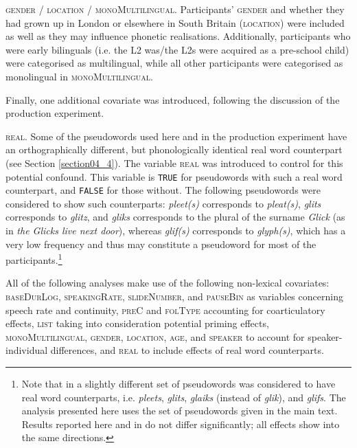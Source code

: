 \textsc{gender} / \textsc{location} / \textsc{monoMultilingual}. Participants’ \textsc{gender} and whether they had grown up in London or elsewhere in South Britain (\textsc{location}) were included as well as they may influence phonetic realisations. Additionally, participants who were early bilinguals (i.e. the L2 was/the L2s were acquired as a pre-school child) were categorised as multilingual, while all other participants were categorised as monolingual in \textsc{monoMultilingual}.

Finally, one additional covariate was introduced, following the discussion of the production experiment.

\textsc{real}. Some of the pseudowords used here and in the production experiment have an orthographically different, but phonologically identical real word counterpart (see Section \ref{section04_4}). The variable \textsc{real} was introduced to control for this potential confound. This variable is \texttt{TRUE} for pseudowords with such a real word counterpart, and \texttt{FALSE} for those without. The following pseudowords were considered to show such counterparts: \textit{pleet(s)} corresponds to \textit{pleat(s)}, \textit{glits} corresponds to \textit{glitz}, and \textit{gliks} corresponds to the plural of the surname \textit{Glick} (as in \textit{the Glicks live next door}), whereas \textit{glif(s)} corresponds to \textit{glyph(s)}, which has a very low frequency and thus may constitute a pseudoword for most of the participants.\footnote{Note that in \citet{Schmitz2021b} a slightly different set of pseudowords was considered to have real word counterparts, i.e. \textit{pleets}, \textit{glits}, \textit{glaiks} (instead of \textit{glik}), and \textit{glifs}. The analysis presented here uses the set of pseudowords given in the main text. Results reported here and in \citet{Schmitz2021b} do not differ significantly; all effects show into the same directions.}  

All of the following analyses make use of the following non-lexical covariates: \textsc{baseDurLog}, \textsc{speakingRate}, \textsc{slideNumber}, and \textsc{pauseBin} as variables concerning speech rate and continuity, \textsc{preC} and \textsc{folType} accounting for coarticulatory effects, \textsc{list} taking into consideration potential priming effects, \textsc{monoMultilingual}, \textsc{gender}, \textsc{location}, \textsc{age}, and \textsc{speaker} to account for speaker-individual differences, and \textsc{real} to include effects of real word counterparts.

